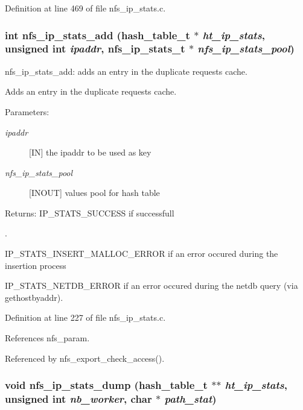 Definition at line 469 of file nfs\_\-ip\_\-stats.c.
\subsubsection{\setlength{\rightskip}{0pt plus 5cm}int nfs\_\-ip\_\-stats\_\-add (hash\_\-table\_\-t $\ast$ {\em ht\_\-ip\_\-stats}, unsigned int {\em ipaddr}, nfs\_\-ip\_\-stats\_\-t $\ast$ {\em nfs\_\-ip\_\-stats\_\-pool})}\label{nfs__ip__stats_8c_a6}


nfs\_\-ip\_\-stats\_\-add: adds an entry in the duplicate requests cache.

Adds an entry in the duplicate requests cache.

\begin{Desc}
\item[Parameters:]
\begin{description}
\item[{\em ipaddr}][IN] the ipaddr to be used as key \item[{\em nfs\_\-ip\_\-stats\_\-pool}][INOUT] values pool for hash table\end{description}
\end{Desc}
\begin{Desc}
\item[Returns:]IP\_\-STATS\_\-SUCCESS if successfull\par
. 

IP\_\-STATS\_\-INSERT\_\-MALLOC\_\-ERROR if an error occured during the insertion process \par
 

IP\_\-STATS\_\-NETDB\_\-ERROR if an error occured during the netdb query (via gethostbyaddr). \end{Desc}


Definition at line 227 of file nfs\_\-ip\_\-stats.c.

References nfs\_\-param.

Referenced by nfs\_\-export\_\-check\_\-access().
\subsubsection{\setlength{\rightskip}{0pt plus 5cm}void nfs\_\-ip\_\-stats\_\-dump (hash\_\-table\_\-t $\ast$$\ast$ {\em ht\_\-ip\_\-stats}, unsigned int {\em nb\_\-worker}, char $\ast$ {\em path\_\-stat})}\label{nfs__ip__stats_8c_a11}


